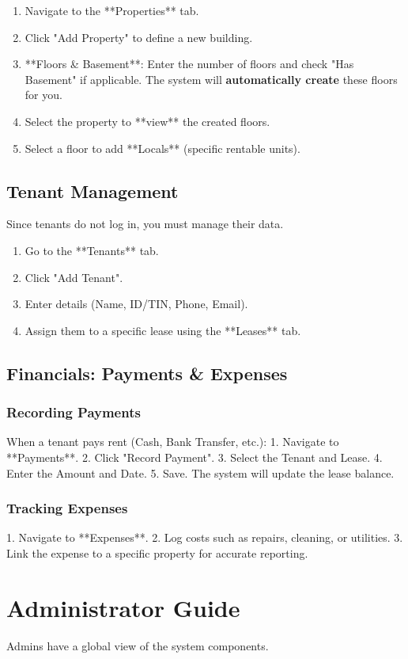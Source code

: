 \documentclass[12pt,a4paper]{article}
\begin{document}
\begin{enumerate}
    \item Navigate to the **Properties** tab.
    \item Click "Add Property" to define a new building.
    \item **Floors \& Basement**: Enter the number of floors and check "Has Basement" if applicable. The system will \textbf{automatically create} these floors for you.
    \item Select the property to **view** the created floors.
    \item Select a floor to add **Locals** (specific rentable units).
\end{enumerate}

\subsection{Tenant Management}
Since tenants do not log in, you must manage their data.
\begin{enumerate}
    \item Go to the **Tenants** tab.
    \item Click "Add Tenant".
    \item Enter details (Name, ID/TIN, Phone, Email).
    \item Assign them to a specific lease using the **Leases** tab.
\end{enumerate}

\subsection{Financials: Payments \& Expenses}
\subsubsection{Recording Payments}
When a tenant pays rent (Cash, Bank Transfer, etc.):
1. Navigate to **Payments**.
2. Click "Record Payment".
3. Select the Tenant and Lease.
4. Enter the Amount and Date.
5. Save. The system will update the lease balance.

\subsubsection{Tracking Expenses}
1. Navigate to **Expenses**.
2. Log costs such as repairs, cleaning, or utilities.
3. Link the expense to a specific property for accurate reporting.

\section{Administrator Guide}
Admins have a global view of the system components.
\end{document}
